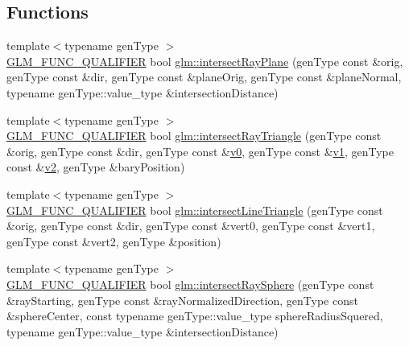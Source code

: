\subsection*{Functions}
\begin{DoxyCompactItemize}
\item 
{\footnotesize template$<$typename gen\+Type $>$ }\\\mbox{\hyperlink{setup_8hpp_a33fdea6f91c5f834105f7415e2a64407}{G\+L\+M\+\_\+\+F\+U\+N\+C\+\_\+\+Q\+U\+A\+L\+I\+F\+I\+ER}} bool \mbox{\hyperlink{group__gtx__intersect_gad3697a9700ea379739a667ea02573488}{glm\+::intersect\+Ray\+Plane}} (gen\+Type const \&orig, gen\+Type const \&dir, gen\+Type const \&plane\+Orig, gen\+Type const \&plane\+Normal, typename gen\+Type\+::value\+\_\+type \&intersection\+Distance)
\item 
{\footnotesize template$<$typename gen\+Type $>$ }\\\mbox{\hyperlink{setup_8hpp_a33fdea6f91c5f834105f7415e2a64407}{G\+L\+M\+\_\+\+F\+U\+N\+C\+\_\+\+Q\+U\+A\+L\+I\+F\+I\+ER}} bool \mbox{\hyperlink{group__gtx__intersect_gab16c1b47c10451e7604b51b39a7ef21d}{glm\+::intersect\+Ray\+Triangle}} (gen\+Type const \&orig, gen\+Type const \&dir, gen\+Type const \&\mbox{\hyperlink{glad_8h_a7062a23d1d434121d4a88f530703d06a}{v0}}, gen\+Type const \&\mbox{\hyperlink{glad_8h_a0779c3b73f9aa3a0ac5b0139b5d291d9}{v1}}, gen\+Type const \&\mbox{\hyperlink{glad_8h_a9a09a1837922b2b806f4589096a52049}{v2}}, gen\+Type \&bary\+Position)
\item 
{\footnotesize template$<$typename gen\+Type $>$ }\\\mbox{\hyperlink{setup_8hpp_a33fdea6f91c5f834105f7415e2a64407}{G\+L\+M\+\_\+\+F\+U\+N\+C\+\_\+\+Q\+U\+A\+L\+I\+F\+I\+ER}} bool \mbox{\hyperlink{group__gtx__intersect_ga9d29b9b3acb504d43986502f42740df4}{glm\+::intersect\+Line\+Triangle}} (gen\+Type const \&orig, gen\+Type const \&dir, gen\+Type const \&vert0, gen\+Type const \&vert1, gen\+Type const \&vert2, gen\+Type \&position)
\item 
{\footnotesize template$<$typename gen\+Type $>$ }\\\mbox{\hyperlink{setup_8hpp_a33fdea6f91c5f834105f7415e2a64407}{G\+L\+M\+\_\+\+F\+U\+N\+C\+\_\+\+Q\+U\+A\+L\+I\+F\+I\+ER}} bool \mbox{\hyperlink{group__gtx__intersect_gac88f8cd84c4bcb5b947d56acbbcfa56e}{glm\+::intersect\+Ray\+Sphere}} (gen\+Type const \&ray\+Starting, gen\+Type const \&ray\+Normalized\+Direction, gen\+Type const \&sphere\+Center, const typename gen\+Type\+::value\+\_\+type sphere\+Radius\+Squered, typename gen\+Type\+::value\+\_\+type \&intersection\+Distance)

\end{DoxyCompactItemize}
